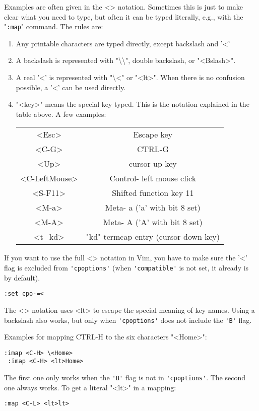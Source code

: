 \begin{description}
\label{<>}
Examples are often given in the <> notation.
Sometimes this is just to make clear what you need to type, but often it can be typed literally, e.g., with the "\verb!:map!" command.
The rules are:
\begin{enumerate}
				\item Any printable characters are typed directly, except backslash and '<'
				\item A backslash is represented with "\textbackslash\textbackslash", double backslash, or "<Bslash>".
				\item A real '<' is represented with "\textbackslash<" or "<lt>".  When there is no
								confusion possible, a '<' can be used directly.
				\item "<key>" means the special key typed.  This is the notation explained in
								the table above.  A few examples:
								\begin{center}
												\begin{tabular}{c c}
																<Esc> & Escape key\\
																<C-G> & CTRL-G\\
																<Up> & cursor up key\\
																<C-LeftMouse> & Control- left mouse click\\
																<S-F11> & Shifted function key 11\\
																<M-a> & Meta- a  ('a' with bit 8 set)\\
																<M-A> & Meta- A  ('A' with bit 8 set)\\
																<t\_kd> & "kd" termcap entry (cursor down key)\\
												\end{tabular}
								\end{center}
\end{enumerate}
\end{description}

If you want to use the full <> notation in Vim, you have to make sure the '<' flag is excluded from \verb!'cpoptions'! (when \verb!'compatible'! is not set, it already is by default).
\begin{Verbatim}[samepage=true]
 :set cpo-=<
\end{Verbatim}
The <> notation uses <lt> to escape the special meaning of key names.
Using a backslash also works, but only when \verb!'cpoptions'! does not include the \verb!'B'! flag.

Examples for mapping CTRL-H to the six characters "<Home>":
\begin{Verbatim}[samepage=true]
 :imap <C-H> \<Home>
 :imap <C-H> <lt>Home>
\end{Verbatim}
The first one only works when the \verb!'B'! flag is not in \verb!'cpoptions'!.
The second one always works.
To get a literal "<lt>" in a mapping:
\begin{Verbatim}[samepage=true]
 :map <C-L> <lt>lt>
\end{Verbatim}

